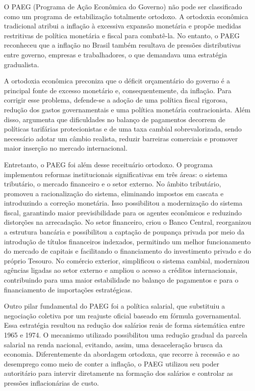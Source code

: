 \documentclass[a4paper,12pt]{article}[abntex2]
\begin{document}
O PAEG (Programa de Ação Econômica do Governo) não pode ser classificado como um programa de estabilização totalmente ortodoxo. A ortodoxia econômica tradicional atribui a inflação à excessiva expansão monetária e propõe medidas restritivas de política monetária e fiscal para combatê-la. No entanto, o PAEG reconheceu que a inflação no Brasil também resultava de pressões distributivas entre governo, empresas e trabalhadores, o que demandava uma estratégia gradualista.

A ortodoxia econômica preconiza que o déficit orçamentário do governo é a principal fonte de excesso monetário e, consequentemente, da inflação. Para corrigir esse problema, defende-se a adoção de uma política fiscal rigorosa, redução dos gastos governamentais e uma política monetária contracionista. Além disso, argumenta que dificuldades no balanço de pagamentos decorrem de políticas tarifárias protecionistas e de uma taxa cambial sobrevalorizada, sendo necessário adotar um câmbio realista, reduzir barreiras comerciais e promover maior inserção no mercado internacional.

Entretanto, o PAEG foi além desse receituário ortodoxo. O programa implementou reformas institucionais significativas em três áreas: o sistema tributário, o mercado financeiro e o setor externo. No âmbito tributário, promoveu a racionalização do sistema, eliminando impostos em cascata e introduzindo a correção monetária. Isso possibilitou a modernização do sistema fiscal, garantindo maior previsibilidade para os agentes econômicos e reduzindo distorções na arrecadação. No setor financeiro, criou o Banco Central, reorganizou a estrutura bancária e possibilitou a captação de poupança privada por meio da introdução de títulos financeiros indexados, permitindo um melhor funcionamento do mercado de capitais e facilitando o financiamento do investimento privado e do próprio Tesouro. No comércio exterior, simplificou o sistema cambial, modernizou agências ligadas ao setor externo e ampliou o acesso a créditos internacionais, contribuindo para uma maior estabilidade no balanço de pagamentos e para o financiamento de importações estratégicas.

Outro pilar fundamental do PAEG foi a política salarial, que substituiu a negociação coletiva por um reajuste oficial baseado em fórmula governamental. Essa estratégia resultou na redução dos salários reais de forma sistemática entre 1965 e 1974. O mecanismo utilizado possibilitou uma redução gradual da parcela salarial na renda nacional, evitando, assim, uma desaceleração brusca da economia. Diferentemente da abordagem ortodoxa, que recorre à recessão e ao desemprego como meio de conter a inflação, o PAEG utilizou seu poder autoritário para intervir diretamente na formação dos salários e controlar as pressões inflacionárias de custo.
\end{document}
